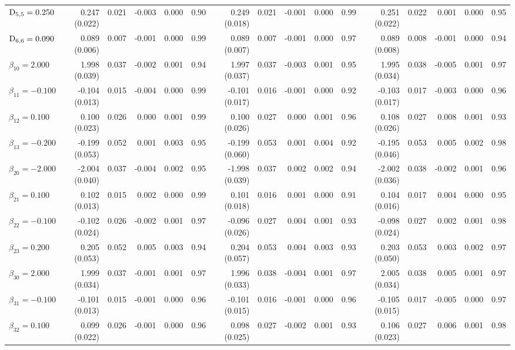 \begin{landscape}
\begin{table}[ht]
\begin{tabular}{l|rrrrr:rrrrr:rrrrr}
  $\mathrm{D}_{5,5} = 0.250$ &  0.247 (0.022) & 0.021 & -0.003 & 0.000 & 0.90 &  0.249 (0.018) & 0.021 & -0.001 & 0.000 & 0.99 &  0.251 (0.022) & 0.022 &  0.001 & 0.000 & 0.95 \\ 
  $\mathrm{D}_{6,6} = 0.090$ &  0.089 (0.006) & 0.007 & -0.001 & 0.000 & 0.99 &  0.089 (0.007) & 0.007 & -0.001 & 0.000 & 0.97 &  0.089 (0.008) & 0.008 & -0.001 & 0.000 & 0.94 \\ 
  $\beta_{10} = 2.000$ &  1.998 (0.039) & 0.037 & -0.002 & 0.001 & 0.94 &  1.997 (0.037) & 0.037 & -0.003 & 0.001 & 0.95 &  1.995 (0.034) & 0.038 & -0.005 & 0.001 & 0.97 \\ 
  $\beta_{11} = -0.100$ & -0.104 (0.013) & 0.015 & -0.004 & 0.000 & 0.99 & -0.101 (0.017) & 0.016 & -0.001 & 0.000 & 0.92 & -0.103 (0.017) & 0.017 & -0.003 & 0.000 & 0.96 \\ 
  $\beta_{12} = 0.100$ &  0.100 (0.023) & 0.026 &  0.000 & 0.001 & 0.99 &  0.100 (0.026) & 0.027 &  0.000 & 0.001 & 0.96 &  0.108 (0.026) & 0.027 &  0.008 & 0.001 & 0.93 \\ 
  $\beta_{13} = -0.200$ & -0.199 (0.053) & 0.052 &  0.001 & 0.003 & 0.95 & -0.199 (0.060) & 0.053 &  0.001 & 0.004 & 0.92 & -0.195 (0.046) & 0.053 &  0.005 & 0.002 & 0.98 \\ 
  $\beta_{20} = -2.000$ & -2.004 (0.040) & 0.037 & -0.004 & 0.002 & 0.95 & -1.998 (0.039) & 0.037 &  0.002 & 0.002 & 0.94 & -2.002 (0.036) & 0.038 & -0.002 & 0.001 & 0.96 \\ 
  $\beta_{21} = 0.100$ &  0.102 (0.013) & 0.015 &  0.002 & 0.000 & 0.99 &  0.101 (0.018) & 0.016 &  0.001 & 0.000 & 0.91 &  0.104 (0.016) & 0.017 &  0.004 & 0.000 & 0.95 \\ 
  $\beta_{22} = -0.100$ & -0.102 (0.024) & 0.026 & -0.002 & 0.001 & 0.97 & -0.096 (0.026) & 0.027 &  0.004 & 0.001 & 0.93 & -0.098 (0.024) & 0.027 &  0.002 & 0.001 & 0.98 \\ 
  $\beta_{23} = 0.200$ &  0.205 (0.053) & 0.052 &  0.005 & 0.003 & 0.94 &  0.204 (0.057) & 0.053 &  0.004 & 0.003 & 0.93 &  0.203 (0.050) & 0.053 &  0.003 & 0.002 & 0.97 \\ 
  $\beta_{30} = 2.000$ &  1.999 (0.034) & 0.037 & -0.001 & 0.001 & 0.97 &  1.996 (0.033) & 0.038 & -0.004 & 0.001 & 0.97 &  2.005 (0.034) & 0.038 &  0.005 & 0.001 & 0.97 \\ 
  $\beta_{31} = -0.100$ & -0.101 (0.013) & 0.015 & -0.001 & 0.000 & 0.96 & -0.101 (0.015) & 0.016 & -0.001 & 0.000 & 0.96 & -0.105 (0.015) & 0.017 & -0.005 & 0.000 & 0.97 \\ 
  $\beta_{32} = 0.100$ &  0.099 (0.022) & 0.026 & -0.001 & 0.000 & 0.96 &  0.098 (0.025) & 0.027 & -0.002 & 0.001 & 0.93 &  0.106 (0.023) & 0.027 &  0.006 & 0.001 & 0.98 \\ 

\end{tabular}
\end{table}
\end{landscape}
